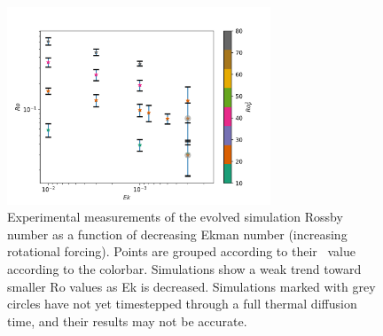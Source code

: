 \begin{figure}[t!]
	\begin{center}
    \includegraphics[width=0.7\textwidth]{./figs/postscripts/Ro_Ek.pdf}
	\end{center}
    \caption[Initial \pro$\,$ results in spherical simulations]
	{
	Experimental measurements of the evolved simulation Rossby number as a function of decreasing Ekman number (increasing rotational forcing).
	Points are grouped according to their \pro$\,$ value according to the colorbar.
	Simulations show a weak trend toward smaller Ro values as Ek is decreased.
	Simulations marked with grey circles have not yet timestepped through a full thermal diffusion time, and their results may not be accurate.
    \label{fig:ro_ek} }
\end{figure}

